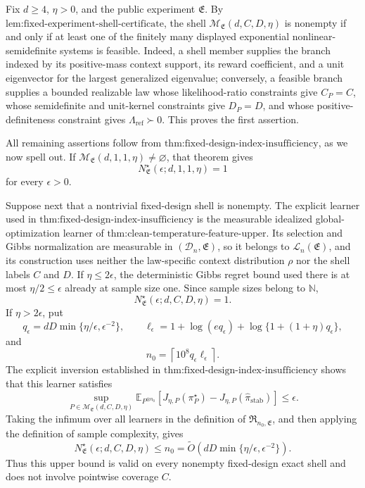 Fix \(d\ge4\), \(\eta>0\), and the public experiment \(\mathfrak E\). By \(\text{lem:fixed-experiment-shell-certificate}\), the shell \(\mathcal M_{\mathfrak E}(d,C,D,\eta)\) is nonempty if and only if at least one of the finitely many displayed exponential nonlinear-semidefinite systems is feasible. Indeed, a shell member supplies the branch indexed by its positive-mass context support, its reward coefficient, and a unit eigenvector for the largest generalized eigenvalue; conversely, a feasible branch supplies a bounded realizable law whose likelihood-ratio constraints give \(C_P=C\), whose semidefinite and unit-kernel constraints give \(D_P=D\), and whose positive-definiteness constraint gives \(\Lambda_{\mathrm{ref}}\succ0\). This proves the first assertion.

All remaining assertions follow from \(\text{thm:fixed-design-index-insufficiency}\), as we now spell out. If \(\mathcal M_{\mathfrak E}(d,1,1,\eta)\ne\varnothing\), that theorem gives
\[
N^\star_{\mathfrak E}(\epsilon;d,1,1,\eta)=1
\]
for every \(\epsilon>0\).

Suppose next that a nontrivial fixed-design shell is nonempty. The explicit learner used in \(\text{thm:fixed-design-index-insufficiency}\) is the measurable idealized global-optimization learner of \(\text{thm:clean-temperature-feature-upper}\). Its selection and Gibbs normalization are measurable in \((\mathcal D_n,\mathfrak E)\), so it belongs to \(\mathcal L_n(\mathfrak E)\), and its construction uses neither the law-specific context distribution \(\rho\) nor the shell labels \(C\) and \(D\). If \(\eta\le2\epsilon\), the deterministic Gibbs regret bound used there is at most \(\eta/2\le\epsilon\) already at sample size one. Since sample sizes belong to \(\mathbb N\),
\[
N^\star_{\mathfrak E}(\epsilon;d,C,D,\eta)=1.
\]
If \(\eta>2\epsilon\), put
\[
q_\epsilon=dD\min\{\eta/\epsilon,\epsilon^{-2}\},
\qquad
\ell_\epsilon=1+\log(eq_\epsilon)+\log\{1+(1+\eta)q_\epsilon\},
\]
and
\[
n_0=\left\lceil10^8q_\epsilon\ell_\epsilon\right\rceil.
\]
The explicit inversion established in \(\text{thm:fixed-design-index-insufficiency}\) shows that this learner satisfies
\[
\sup_{P\in\mathcal M_{\mathfrak E}(d,C,D,\eta)}
\mathbb E_{P^{\otimes n_0}}
\left[J_{\eta,P}(\pi_P^\star)-J_{\eta,P}(\widehat\pi_{\mathrm{stab}})\right]
\le\epsilon.
\]
Taking the infimum over all learners in the definition of \(\mathfrak R_{n_0,\mathfrak E}\), and then applying the definition of sample complexity, gives
\[
N^\star_{\mathfrak E}(\epsilon;d,C,D,\eta)
\le n_0
=\widetilde O\!\left(dD\min\{\eta/\epsilon,\epsilon^{-2}\}\right).
\]
Thus this upper bound is valid on every nonempty fixed-design exact shell and does not involve pointwise coverage \(C\).

